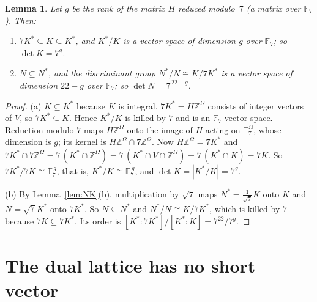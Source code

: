 \documentclass[11pt,a4paper]{article}
\newtheorem{lemma}[theorem]{Lemma}
\theoremstyle{definition}
\theoremstyle{remark}
\newcommand{\ZZ}{\mathbb{Z}}
\newcommand{\FF}{\mathbb{F}}
\newcommand{\Om}{\Omega}
\begin{document}
\begin{lemma}\label{lem:det}
Let $g$ be the rank of the matrix $H$ reduced modulo~$7$ (a matrix over $\FF_7$). Then:
\begin{enumerate}[label=\textup{(\alph*)}]
\item $7K^*\subseteq K\subseteq K^*$, and $K^*/K$ is a vector space of dimension $g$ over $\FF_7$; so $\det K=7^{g}$.
\item $N\subseteq N^*$, and the discriminant group $N^*/N\cong K/7K^*$ is a vector space of dimension $22-g$ over
$\FF_7$; so $\det N=7^{\,22-g}$.
\end{enumerate}
\end{lemma}
\begin{proof}
(a) $K\subseteq K^*$ because $K$ is integral. $7K^*=H\ZZ^{\Om}$ consists of integer vectors of $V$, so
$7K^*\subseteq K$. Hence $K^*/K$ is killed by $7$ and is an $\FF_7$-vector space. Reduction modulo $7$ maps
$H\ZZ^{\Om}$ onto the image of $H$ acting on $\FF_7^{\Om}$, whose dimension is $g$; its kernel is
$H\ZZ^{\Om}\cap7\ZZ^{\Om}$. Now $H\ZZ^{\Om}=7K^*$ and
$7K^*\cap7\ZZ^{\Om}=7\,(K^*\cap\ZZ^{\Om})=7\,(K^*\cap V\cap\ZZ^{\Om})=7\,(K^*\cap K)=7K$. So
$7K^*/7K\cong\FF_7^{\,g}$, that is, $K^*/K\cong\FF_7^{\,g}$, and $\det K=|K^*/K|=7^g$.

(b) By Lemma~\ref{lem:NK}(b), multiplication by $\sqrt7$ maps $N^*=\frac1{\sqrt7}K$ onto $K$ and $N=\sqrt7K^*$ onto
$7K^*$. So $N\subseteq N^*$ and $N^*/N\cong K/7K^*$, which is killed by $7$ because $7K\subseteq7K^*$. Its order is
$[K^*:7K^*]/[K^*:K]=7^{22}/7^{g}$.
\end{proof}

\section{The dual lattice has no short vector}\label{sec:min}
\end{document}
